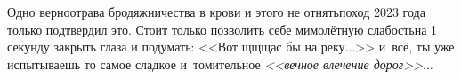 {{Одно верно\mdash отрава бродяжничества в крови и этого не отнять\mdash поход 2023 года только подтвердил это. Стоит только позволить себе мимолётную слабость\mdash на 1 секунду закрыть глаза и подумать: <<Вот щ\sdash щ\sdash щас бы на реку$\ldots$>> и~всё, ты уже испытываешь то самое сладкое и~томительное \textit{<<вечное влечение дорог>>}$\ldots$




}

}